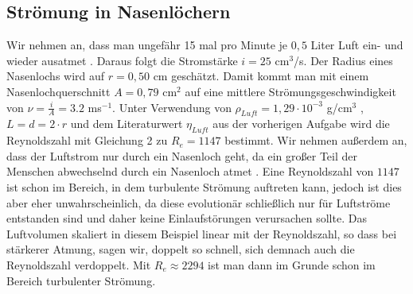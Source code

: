 \documentclass{article}
\begin{document}
\subsection{Strömung in Nasenlöchern}
Wir nehmen an, dass man ungefähr 15 mal pro Minute je $0,5$ Liter Luft ein- und wieder ausatmet \cite{7}. Daraus folgt die Stromstärke $i = 25  $ cm$^3$/s. Der Radius eines Nasenlochs wird auf $r = 0,50$ cm geschätzt. Damit kommt man mit einem Nasenlochquerschnitt $A = 0,79$ cm$^2$ auf eine mittlere Strömungsgeschwindigkeit von $\nu= \frac{i}{A} = 3.2$ ms$^{-1}$. Unter Verwendung von $\rho_{Luft}= 1,29 \cdot 10^{-3}$ g/cm$^3$ \cite{1}, $L=d=2 \cdot r$ und dem Literaturwert $\eta_{Luft}$ aus der vorherigen Aufgabe wird die Reynoldszahl mit Gleichung 2 zu $R_e = 1147$ bestimmt. Wir nehmen außerdem an, dass der Luftstrom nur durch ein Nasenloch geht, da ein großer Teil der Menschen abwechselnd durch ein Nasenloch atmet \cite{5}. Eine Reynoldszahl von $1147$ ist schon im Bereich, in dem turbulente Strömung auftreten kann, jedoch ist dies aber eher unwahrscheinlich, da diese evolutionär schließlich nur für Luftströme entstanden sind und daher keine Einlaufstörungen verursachen sollte. Das Luftvolumen skaliert in diesem Beispiel linear mit der Reynoldszahl, so dass bei stärkerer Atmung, sagen wir, doppelt so schnell, sich demnach auch die Reynoldszahl verdoppelt. Mit $R_e \approx 2294$ ist man dann
im Grunde schon im Bereich turbulenter Strömung.
\end{document}
